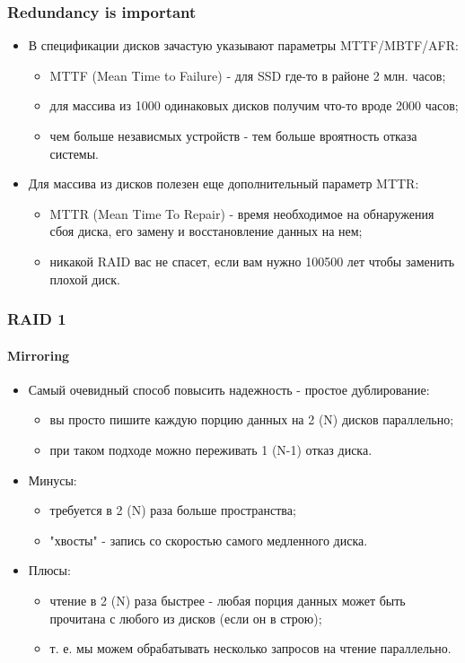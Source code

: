\begin{frame}
\frametitle{Redundancy is important}
\begin{itemize}
  \item В спецификации дисков зачастую указывают параметры MTTF/MBTF/AFR:
  \begin{itemize}
    \item MTTF (Mean Time to Failure) - для SSD где-то в районе 2 млн. часов;
    \item для массива из 1000 одинаковых дисков получим что-то вроде 2000
    часов;
    \item чем больше независмых устройств - тем больше вроятность отказа
    системы.
  \end{itemize}
  \item Для массива из дисков полезен еще дополнительный параметр MTTR:
  \begin{itemize}
    \item MTTR (Mean Time To Repair) - время необходимое на обнаружения сбоя
    диска, его замену и восстановление данных на нем;
    \item никакой RAID вас не спасет, если вам нужно 100500 лет чтобы заменить
    плохой диск.
  \end{itemize}
\end{itemize}
\end{frame}

\begin{frame}
\frametitle{RAID 1}
\framesubtitle{Mirroring}
\begin{itemize}
  \item Самый очевидный способ повысить надежность - простое дублирование:
  \begin{itemize}
    \item вы просто пишите каждую порцию данных на 2 (N) дисков параллельно;
    \item при таком подходе можно переживать 1 (N-1) отказ диска.
  \end{itemize}
  \item Минусы:
  \begin{itemize}
    \item требуется в 2 (N) раза больше пространства;
    \item "хвосты" - запись со скоростью самого медленного диска.
  \end{itemize}
  \item Плюсы:
  \begin{itemize}
    \item чтение в 2 (N) раза быстрее - любая порция данных может быть прочитана
    с любого из дисков (если он в строю);
    \item т. е. мы можем обрабатывать несколько запросов на чтение параллельно.
  \end{itemize}
\end{itemize}
\end{frame}


